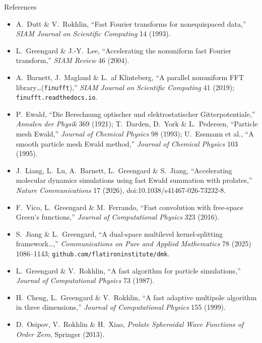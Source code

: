 \documentclass[aspectratio=169,11pt]{beamer}
\begin{document}
\begin{frame}{References}
\scriptsize
\begin{itemize}
  \item A.\ Dutt \& V.\ Rokhlin, ``Fast Fourier transforms for nonequispaced data,'' \emph{SIAM Journal on Scientific Computing} 14 (1993).
  \item L.\ Greengard \& J.-Y.\ Lee, ``Accelerating the nonuniform fast Fourier transform,'' \emph{SIAM Review} 46 (2004).
  \item A.\ Barnett, J.\ Magland \& L.\ af Klinteberg, ``A parallel nonuniform FFT library\dots (\texttt{finufft}),'' \emph{SIAM Journal on Scientific Computing} 41 (2019); \texttt{finufft.readthedocs.io}.
  \item P.\ Ewald, ``Die Berechnung optischer und elektrostatischer Gitterpotentiale,'' \emph{Annalen der Physik} 369 (1921); T.\ Darden, D.\ York \& L.\ Pedersen, ``Particle mesh Ewald,'' \emph{Journal of Chemical Physics} 98 (1993); U.\ Essmann et al., ``A smooth particle mesh Ewald method,'' \emph{Journal of Chemical Physics} 103 (1995).
  \item J.\ Liang, L.\ Lu, A.\ Barnett, L.\ Greengard \& S.\ Jiang, ``Accelerating molecular dynamics simulations using fast Ewald summation with prolates,'' \emph{Nature Communications} 17 (2026), doi:10.1038/s41467-026-73232-8.
  \item F.\ Vico, L.\ Greengard \& M.\ Ferrando, ``Fast convolution with free-space Green's functions,'' \emph{Journal of Computational Physics} 323 (2016).
  \item S.\ Jiang \& L.\ Greengard, ``A dual-space multilevel kernel-splitting framework\dots,'' \emph{Communications on Pure and Applied Mathematics} 78 (2025) 1086--1143; \texttt{github.com/flatironinstitute/dmk}.
  \item L.\ Greengard \& V.\ Rokhlin, ``A fast algorithm for particle simulations,'' \emph{Journal of Computational Physics} 73 (1987).
  \item H.\ Cheng, L.\ Greengard \& V.\ Rokhlin, ``A fast adaptive multipole algorithm in three dimensions,'' \emph{Journal of Computational Physics} 155 (1999).
  \item D.\ Osipov, V.\ Rokhlin \& H.\ Xiao, \emph{Prolate Spheroidal Wave Functions of Order Zero}, Springer (2013).
\end{itemize}
\end{frame}
\end{document}
